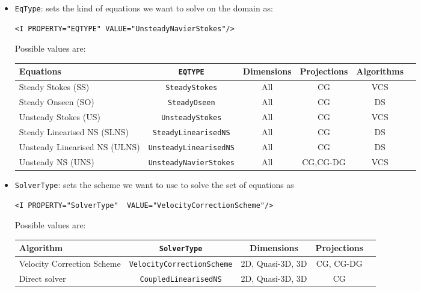 \begin{itemize}
\item \texttt{EqType}: sets the kind of equations we want to solve on the domain as:

\begin{lstlisting}[style=XMLStyle]
<I PROPERTY="EQTYPE" VALUE="UnsteadyNavierStokes"/>
\end{lstlisting}

Possible values are:

\begin{table}
\begin{center}
\begin{tabular}{|l|c|c|c|c|c|} \hline
{Equations} & {\texttt{EQTYPE}} &{Dimensions}&{Projections} & Algorithms\\ \hline
Steady Stokes (SS)& \texttt{SteadyStokes} & All & CG &VCS \\ \hline
Steady Onseen (SO) & \texttt{SteadyOseen} & All & CG& DS \\ \hline
Unsteady Stokes (US) & \texttt{UnsteadyStokes} & All & CG &VCS \\ \hline
Steady Linearised NS (SLNS) & \texttt{SteadyLinearisedNS} & All & CG & DS \\ \hline
Unsteady Linearised NS (ULNS) & \texttt{UnsteadyLinearisedNS} & All & CG & DS \\ \hline
Unsteady NS (UNS) & \texttt{UnsteadyNavierStokes} & All & CG,CG-DG & VCS \\ \hline





\end{tabular}
\end{center}
\end{table}


\item \texttt{SolverType}: sets the scheme we want to use to solve the set of equations as 

\begin{lstlisting}[style=XMLStyle]
<I PROPERTY="SolverType"  VALUE="VelocityCorrectionScheme"/>\end{lstlisting}

Possible values are:

\begin{table}
\begin{center}
\begin{tabular}{|l|c|c|c|c|} \hline
{Algorithm} & {\texttt{SolverType}} &{Dimensions}&{Projections} \\ \hline
Velocity Correction Scheme & \texttt{VelocityCorrectionScheme} & 2D, Quasi-3D, 3D & CG, CG-DG\\ \hline
Direct solver & \texttt{CoupledLinearisedNS} & 2D, Quasi-3D, 3D &CG\\ \hline
\end{tabular}
\end{center}
\end{table}


\end{itemize}

